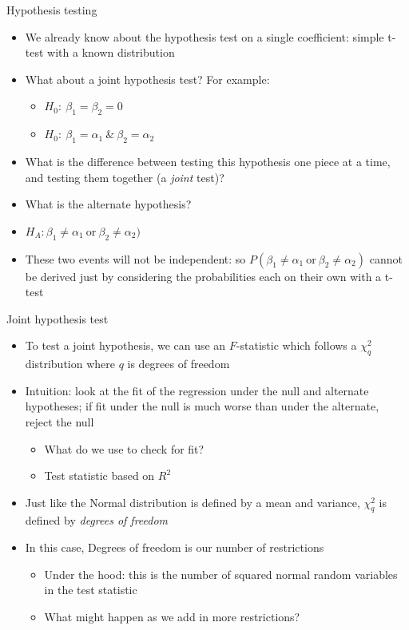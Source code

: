 \documentclass[aspectratio=169]{beamer}
\begin{document}
\begin{frame}{Hypothesis testing}
    \begin{itemize}
        \item We already know about the hypothesis test on a single coefficient: simple t-test with a known distribution
        \item What about a joint hypothesis test? For example:
        \begin{itemize}
            \item $H_0:~\beta_1 = \beta_2 = 0$
            \item $H_0:~\beta_1 = \alpha_1~\&~\beta_2 = \alpha_2$
        \end{itemize}
        \item What is the difference between testing this hypothesis one piece at a time, and testing them together (a \textit{joint} test)?
        \item What is the alternate hypothesis?

        \pause
        \item $H_A: \beta_1 \neq \alpha_1~ \text{or} ~\beta_2 \neq \alpha_2)$
        \item These two events will not be independent: so $P(\beta_1 \neq \alpha_1~ \text{or} ~\beta_2 \neq \alpha_2) $ cannot be derived just by considering the probabilities each on their own with a t-test
    \end{itemize}
\end{frame}

\begin{frame}{Joint hypothesis test}
    \begin{itemize}
        \item To test a joint hypothesis, we can use an $F$-statistic which follows a $\chi^2_q$ distribution where $q$ is degrees of freedom
        \item Intuition: look at the fit of the regression under the null and alternate hypotheses; if fit under the null is much worse than under the alternate, reject the null
        \begin{itemize}
            \item What do we use to check for fit?
            \pause
            \item Test statistic based on $R^2$
        \end{itemize}
        \item Just like the Normal distribution is defined by a mean and variance, $\chi^2_q$ is defined by \textit{degrees of freedom}
        \item In this case, Degrees of freedom is our number of restrictions
        \begin{itemize}
            \item Under the hood: this is the number of squared normal random variables in the test statistic
            \item What might happen as we add in more restrictions?
        \end{itemize}
    \end{itemize}
\end{frame}
\end{document}
